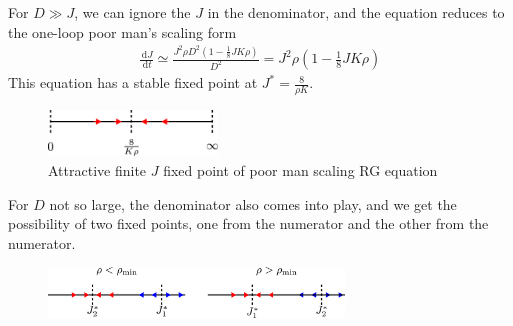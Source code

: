 \documentclass{revtex4-2}
\numberwithin{equation}{section}
\begin{document}
For \(D \gg J\), we can ignore the \(J\) in the denominator, and the equation reduces to the one-loop poor man's scaling form
\begin{equation}\begin{aligned}
	\label{pms_mchannel}
	\frac{\:\mathrm{d}J}{\:\mathrm{d}t} \simeq \frac{J^2 \rho D^2 \left(1 - \frac{1}{8}JK\rho\right)}{D^2} = J^2 \rho \left(1 - \frac{1}{8}JK\rho\right)
\end{aligned}\end{equation}
This equation has a stable fixed point at \(J^* = \frac{8}{\rho K}\).

\begin{figure}[htpb]
	\centering
	\includegraphics[width=0.4\textwidth]{rg_flow_pms.pdf}
	\caption{Attractive finite \(J\) fixed point of poor man scaling RG equation}
\end{figure}
For \(D\) not so large, the denominator also comes into play, and we get the possibility of two fixed points, one from the numerator and the other from the numerator.
\begin{figure}[htpb]
	\centering
	\includegraphics[width=0.7\textwidth]{./rg_flow.pdf}
	\caption{}
	\label{rg_flow_general}
\end{figure}
\end{document}
